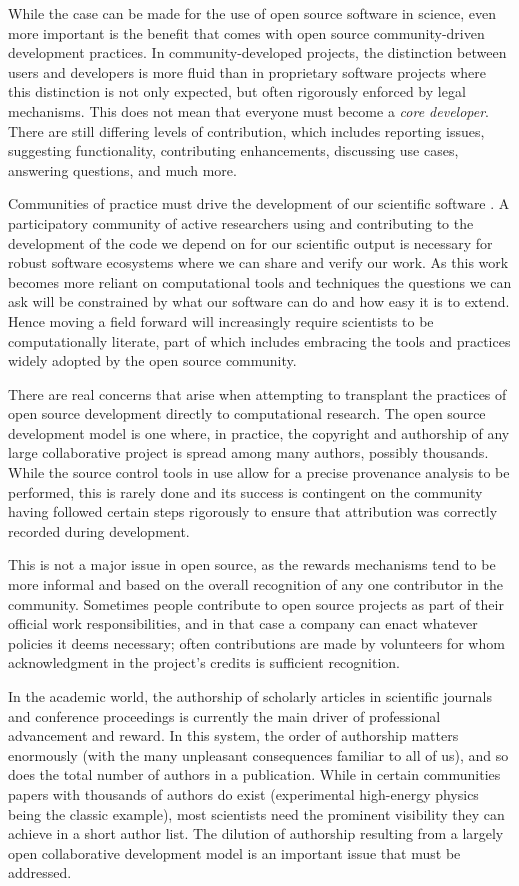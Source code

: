 \documentclass[11pt,oneside,english]{article}
\begin{document}
While the case can be made for the use of open source software in science, even
more important is the benefit that comes with open source community-driven
development practices.  In community-developed projects, the distinction
between users and developers is more fluid than in proprietary software
projects where this distinction is not only expected, but often rigorously
enforced by legal mechanisms. This does not mean that everyone must become a
\emph{core developer}. There are still differing levels of contribution, which
includes reporting issues, suggesting functionality, contributing
enhancements, discussing use cases, answering questions, and much more.

Communities of practice must drive the development of our scientific software
\cite{turk2013scale}. A participatory community of active researchers using and
contributing to the development of the code we depend on for our scientific
output is necessary for robust software ecosystems where we can share and
verify our work. As this work becomes more reliant on computational tools and
techniques the questions we can ask will be constrained by what our software
can do and how easy it is to extend. Hence moving a field forward will
increasingly require scientists to be computationally literate, part of
which includes embracing the tools and practices widely adopted by the open
source community.

There are real concerns that arise when attempting to transplant the practices
of open source development directly to computational research. The open source
development model is one where, in practice, the copyright and authorship of
any large collaborative project is spread among many authors, possibly
thousands.  While the source control tools in use allow for a
precise provenance analysis to be performed, this is rarely done and
its success is contingent on the community having followed certain steps
rigorously to ensure that attribution was correctly recorded during
development.

This is not a major issue in open source, as the rewards mechanisms tend to be
more informal and based on the overall recognition of any one contributor in
the community. Sometimes people contribute to open source projects as part of
their official work responsibilities, and in that case a company can enact
whatever policies it deems necessary; often contributions are made by
volunteers for whom acknowledgment in the project's credits is sufficient
recognition.

In the academic world, the authorship of scholarly articles in scientific
journals and conference proceedings is currently the main driver of
professional advancement and reward. In this system, the order of authorship
matters enormously (with the many unpleasant consequences familiar to all of
us), and so does the total number of authors in a publication. While in certain
communities papers with thousands of authors do exist (experimental high-energy
physics being the classic example), most scientists need the prominent
visibility they can achieve in a short author list. The dilution of authorship
resulting from a largely open collaborative development model is an important
issue that must be addressed.
\end{document}
